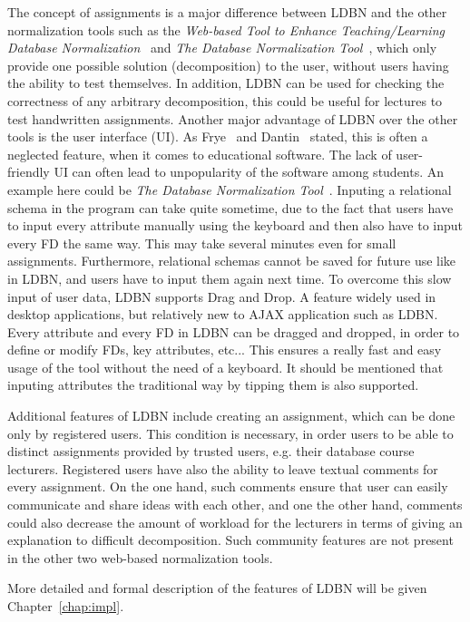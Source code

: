 The concept of assignments is a major
difference between LDBN and the other normalization tools such as the
\textit{Web-based Tool to Enhance Teaching/Learning Database 
Normalization}~\cite{p8} and \textit{The Database Normalization Tool}~\cite{w1}, 
which only provide 
one possible solution (decomposition) to the user, without users having the ability to test 
themselves. In addition, LDBN can be used for checking the correctness of any
arbitrary decomposition, this could be useful for lectures to test handwritten assignments. 
Another major advantage of LDBN over the other tools is the user interface (UI). 
As Frye~\cite{p10} and Dantin~\cite{p9} stated, this is often a
neglected feature, when it comes to educational software. The lack of user-friendly UI 
can often lead to unpopularity of the software among students. An example here could be 
\textit{The Database Normalization Tool}~\cite{w1}. Inputing a relational schema in the program can
take quite sometime, due to the fact that
users have to input every attribute manually using the keyboard and then also 
have to input every FD the same way. This may take several minutes even for small  
assignments. Furthermore, relational schemas cannot be saved for future use like 
in LDBN, and users have to input them again next time. To overcome this slow input of user data, 
LDBN supports Drag and Drop. A feature widely used in desktop
applications, but relatively new to AJAX application such as LDBN. Every attribute
and every FD in LDBN can be dragged and dropped, in order 
to define or modify FDs, key attributes, etc... This ensures a really fast and easy
usage of the tool without the need of a keyboard. It should be mentioned
that inputing attributes the traditional way by tipping them is also supported.

Additional features of LDBN include creating an assignment, which can be done 
only by registered users. This condition is necessary, in order users to be able 
to distinct assignments provided by trusted users, e.g. their database course
lecturers. Registered users have also the ability to leave textual comments 
for every assignment. On the one hand, such
comments ensure that user can easily communicate and share ideas
with each other, and one the other hand, comments could also decrease the amount of workload
for the lecturers in terms of giving an explanation to difficult decomposition.
Such community features are not present in the other two web-based 
normalization tools.

More detailed and formal description of the features of LDBN will be given 
Chapter~\ref{chap:impl}. 


